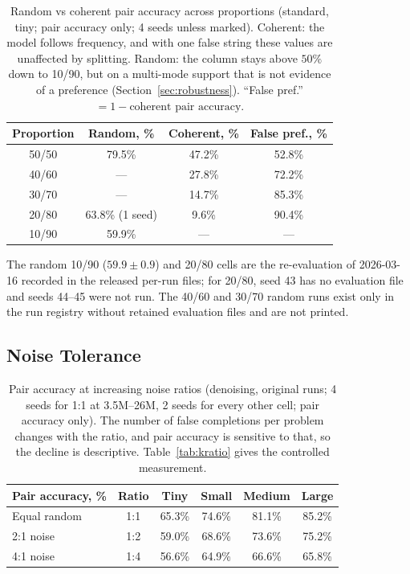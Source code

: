 \documentclass{article}
\begin{document}
\begin{table}[ht]
\centering
\small
\begin{tabular}{cccc}
\toprule
Proportion & Random, \% & Coherent, \% & False pref., \% \\
\midrule
50/50 & 79.5\% & 47.2\% & 52.8\% \\
40/60 & --- & 27.8\% & 72.2\% \\
30/70 & --- & 14.7\% & 85.3\% \\
20/80 & 63.8\% (1 seed) & 9.6\%  & 90.4\% \\
10/90 & 59.9\% & ---    & --- \\
\bottomrule
\end{tabular}
\caption{Random vs coherent pair accuracy across proportions (standard, tiny; pair accuracy only; 4 seeds unless marked). Coherent: the model follows frequency, and with one false string these values are unaffected by splitting. Random: the column stays above $50\%$ down to 10/90, but on a multi-mode support that is not evidence of a preference (Section~\ref{sec:robustness}). ``False pref.'' $= 1 - \text{coherent pair accuracy}$.}
\label{tab:frequency}
\end{table}

The random 10/90 ($59.9 \pm 0.9$) and 20/80 cells are the re-evaluation of 2026-03-16 recorded in the released per-run files; for 20/80, seed 43 has no evaluation file and seeds 44--45 were not run. The 40/60 and 30/70 random runs exist only in the run registry without retained evaluation files and are not printed.

\subsection{Noise Tolerance}

\begin{table}[ht]
\centering
\small
\begin{tabular}{lccccc}
\toprule
Pair accuracy, \% & Ratio & Tiny & Small & Medium & Large \\
\midrule
Equal random & 1:1 & 65.3\% & 74.6\% & 81.1\% & 85.2\% \\
2:1 noise    & 1:2 & 59.0\% & 68.6\% & 73.6\% & 75.2\% \\
4:1 noise    & 1:4 & 56.6\% & 64.9\% & 66.6\% & 65.8\% \\
\bottomrule
\end{tabular}
\caption{Pair accuracy at increasing noise ratios (denoising, original runs; 4 seeds for 1:1 at 3.5M--26M, 2 seeds for every other cell; pair accuracy only). The number of false completions per problem changes with the ratio, and pair accuracy is sensitive to that, so the decline is descriptive. Table~\ref{tab:kratio} gives the controlled measurement.}
\label{tab:noise}
\end{table}
\end{document}
